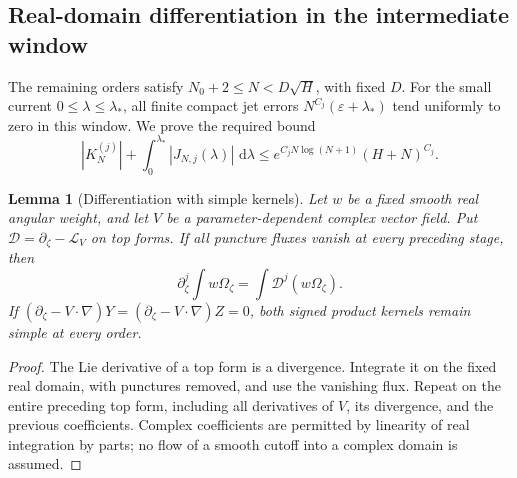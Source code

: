 \documentclass[11pt]{article}
\numberwithin{equation}{section}
\newtheorem{lemma}[theorem]{Lemma}
\theoremstyle{definition}
\newcommand{\dd}{\,\mathrm d}
\newcommand{\eps}{\varepsilon}
\begin{document}
\subsection{Real-domain differentiation in the intermediate window}
\label{iso:lie-section}

The remaining orders satisfy $N_0+2\le N<D\sqrt H$, with fixed $D$.
For the small current $0\le\lambda\le\lambda_*$, all finite compact
jet errors $N^{C_j}(\eps+\lambda_*)$ tend uniformly to zero in this
window. We prove the required bound
\begin{equation}
 |K_N^{(j)}|+\int_0^{\lambda_*}|J_{N,j}(\lambda)|\,\dd\lambda
 \le e^{C_jN\log(N+1)}(H+N)^{C_j}.
 \label{iso:middle-bound}
\end{equation}

\begin{lemma}[Differentiation with simple kernels]\label{iso:lie}
Let $w$ be a fixed smooth real angular weight, and let $V$ be a
parameter-dependent complex vector field. Put
$\mathcal D=\partial_\zeta-\mathcal L_V$ on top forms. If all
puncture fluxes vanish at every preceding stage, then
\[
 \partial_\zeta^j\int w\Omega_\zeta
 =\int\mathcal D^j(w\Omega_\zeta).
\]
If $(\partial_\zeta-V\cdot\nabla)Y=
(\partial_\zeta-V\cdot\nabla)Z=0$, both signed product kernels
remain simple at every order.
\end{lemma}
\begin{proof}
The Lie derivative of a top form is a divergence. Integrate it on the
fixed real domain, with punctures removed, and use the vanishing flux.
Repeat on the entire preceding top form, including all derivatives of
$V$, its divergence, and the previous coefficients. Complex coefficients
are permitted by linearity of real integration by parts; no flow of a
smooth cutoff into a complex domain is assumed.
\end{proof}
\end{document}
